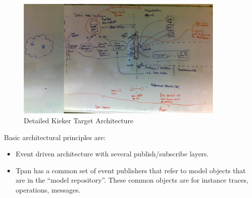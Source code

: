 \documentclass[12pt,journal,a4paper,twocolumn,final,oneside]{IEEEtran}%
\begin{document}
\begin{figure}
 \centering
 \includegraphics[width=0.9\textwidth]{./figures/2010-03-09-TargetArchitectureDetail.jpg}
 \caption{Detailed Kieker Target Architecture}\label{DetailedArchitecture201003}
\end{figure}

Basic architectural principles are:
\begin{itemize}
 \item Event driven architecture with several publish/subscribe layers.
 \item Tpan has a common set of event publishers that refer to model objects that are in the ``model repository''. These common objects are for instance traces, operations, messages.
\end{itemize}



\nocite{vanHoornRohrHasselbringWallerEhlersFreyKieselhorst2009TRContinuousMonitoringOfSoftwareServicesDesignAndApplicationOfTheKiekerFramework,RohrHoornMatevskaStoeverSommerGieseckeHasselbring2008KiekerContinuousMonitoringAndOnDemandVisualizationOfJavaSoftwareBehavior}

\end{document}
